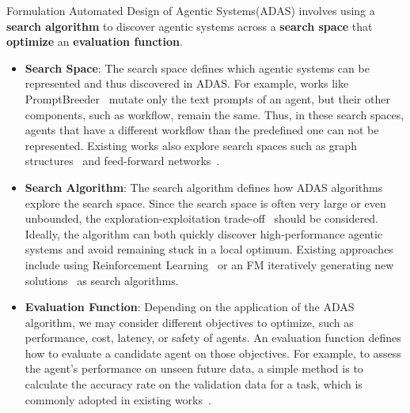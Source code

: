 \documentclass{article}
\newcommand{\problemlong}{Automated Design of Agentic Systems\xspace}
\newcommand{\problem}{ADAS\xspace}
\begin{document}
\begin{mybox}{Formulation}
\problemlong (\problem) involves using a \textbf{search algorithm} to discover agentic systems across a \textbf{search space} that \textbf{optimize} an \textbf{evaluation function}.
\end{mybox}

\begin{itemize}[label=\large\textbullet, labelsep=0.5em, itemsep=0.2em, left=0pt]
    \item \textbf{Search Space}: The search space defines which agentic systems can be represented and thus discovered in \problem. For example, works like PromptBreeder~\citep{fernando2024promptbreeder} mutate only the text prompts of an agent, but their other components, such as workflow, remain the same. Thus, in these search spaces, agents that have a different workflow than the predefined one can not be represented. Existing works also explore search spaces such as graph structures~\citep{zhugegptswarm} and feed-forward networks~\citep{liu2023dynamic}.
    \item \textbf{Search Algorithm}: The search algorithm defines how \problem algorithms explore the search space. Since the search space is often very large or even unbounded, the exploration-exploitation trade-off~\citep{sutton2018reinforcement} should be considered. Ideally, the algorithm can both quickly discover high-performance agentic systems and avoid remaining stuck in a local optimum. Existing approaches include using Reinforcement Learning~\citep{zhugegptswarm} or an FM iteratively generating new solutions~\citep{fernando2024promptbreeder} as search algorithms.
    \item \textbf{Evaluation Function}: Depending on the application of the \problem algorithm, we may consider different objectives to optimize, such as performance, cost, latency, or safety of agents. An evaluation function defines how to evaluate a candidate agent on those objectives. For example, to assess the agent's performance on unseen future data, a simple method is to calculate the accuracy rate on the validation data for a task, which is commonly adopted in existing works~\citep{zhugegptswarm,fernando2024promptbreeder}.
\end{itemize}
\end{document}

